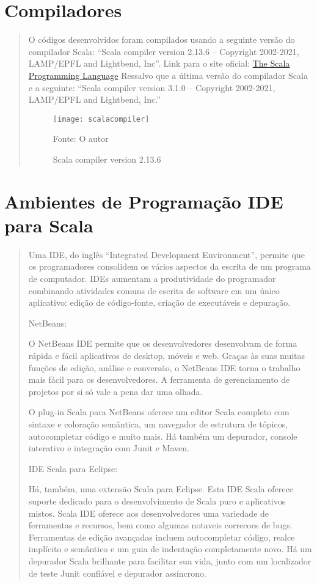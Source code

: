 \section{Compiladores}
\begin{quote}
  O códigos desenvolvidos foram compilados usando a seguinte versão do compilador Scala:
  “Scala compiler version 2.13.6 -- Copyright 2002-2021, LAMP/EPFL and Lightbend, Inc”.
  Link para o site oficial: \href{https://www.scala-lang.org/}{The Scala Programming Language}
  Ressalvo que a última versão do compilador Scala e a seguinte:  “Scala compiler version 3.1.0 -- Copyright 2002-2021, LAMP/EPFL and Lightbend, Inc.”
  \begin{figure}[H]
    \begin{center}
      \texttt{[image: scalacompiler]}
      \caption{Scala compiler version 2.13.6} \label{compiler}
      {\tiny \sf Fonte: O autor }
    \end{center}
  \end{figure}

\end{quote}

\section{Ambientes de Programa\c{c}\~{a}o IDE para Scala}
\begin{quote}
Uma IDE, do inglês “Integrated Development Environment”,  permite que os programadores consolidem os vários aspectos da escrita de um programa de computador. IDEs aumentam a produtividade do programador combinando atividades comuns de escrita de software em um único aplicativo: edição de código-fonte, criação de executáveis e depuração.

\hspace{2.5mm} NetBeans:

O NetBeans IDE permite que os desenvolvedores desenvolvam de forma rápida e fácil aplicativos de desktop, móveis e web. Graças às suas muitas funções de edição, análise e conversão, o NetBeans IDE torna o trabalho mais fácil para os desenvolvedores. A ferramenta de gerenciamento de projetos por si só vale a pena dar uma olhada.

O plug-in Scala para NetBeans oferece um editor Scala completo com sintaxe e coloração semântica, um navegador de estrutura de tópicos, autocompletar código e muito mais. Há também um depurador, console interativo e integração com Junit e Maven.

\hspace{2.5mm} IDE Scala para Eclipse:

Há, também, uma extensão Scala para Eclipse.
Esta IDE Scala oferece suporte dedicado para o desenvolvimento de Scala puro e aplicativos mistos. Scala IDE oferece aos desenvolvedores uma variedade de ferramentas e recursos, bem como algumas notaveis correcoes de bugs.
Ferramentas de edição avançadas incluem autocompletar código, realce implícito e semântico e um guia de indentação completamente novo. Há um depurador Scala brilhante para facilitar sua vida, junto com um localizador de teste Junit confiável e depurador assíncrono.



\end{quote}
